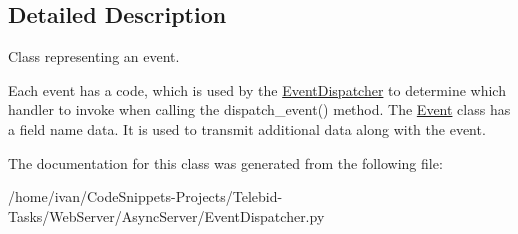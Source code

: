 \subsection{Detailed Description}
Class representing an event. 

Each event has a code, which is used by the \hyperlink{class_event_dispatcher_1_1_event_dispatcher}{Event\-Dispatcher} to determine which handler to invoke when calling the dispatch\-\_\-event() method. The \hyperlink{class_event_dispatcher_1_1_event}{Event} class has a field name data. It is used to transmit additional data along with the event. 

The documentation for this class was generated from the following file\-:\begin{DoxyCompactItemize}
\item 
/home/ivan/\-Code\-Snippets-\/\-Projects/\-Telebid-\/\-Tasks/\-Web\-Server/\-Async\-Server/Event\-Dispatcher.\-py\end{DoxyCompactItemize}
